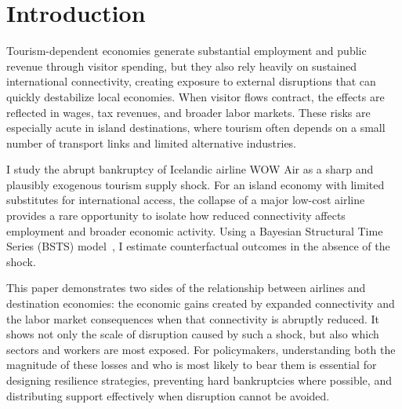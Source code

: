 \documentclass[12pt]{article}
\begin{document}
\begin{abstract}
Tourism-dependent economies face substantial risks when international visitor flows are disrupted, yet evidence on the short-run labor market effects of sudden tourism supply shocks remains limited. This paper exploits the sudden bankruptcy of WOW Air as a natural experiment that sharply curtailed international tourism to Iceland. Using a Bayesian Structural Time Series model, I estimate labor market outcomes relative to a counterfactual in which the airline did not exit. Nine months later, I find that the bankruptcy reduced international travel by more than 20\% and tourism employment (excluding air transport) by 8\%. At the national level, unemployment was nearly 50\% higher than would otherwise have been expected. These results highlight the vulnerability of tourism-dependent economies to sudden transport disruptions.
\\ 
\\
Keywords: tourism employment; air transport; tourism shocks; labor markets; island economies; causal inference
\end{abstract}
\clearpage

\section{Introduction}\label{sec:Introduction}
Tourism-dependent economies generate substantial employment and public revenue through visitor spending, but they also rely heavily on sustained international connectivity, creating exposure to external disruptions that can quickly destabilize local economies. When visitor flows contract, the effects are reflected in wages, tax revenues, and broader labor markets. These risks are especially acute in island destinations, where tourism often depends on a small number of transport links and limited alternative industries.

I study the abrupt bankruptcy of Icelandic airline WOW Air as a sharp and plausibly exogenous tourism supply shock. For an island economy with limited substitutes for international access, the collapse of a major low-cost airline provides a rare opportunity to isolate how reduced connectivity affects employment and broader economic activity. Using a Bayesian Structural Time Series (BSTS) model~\citep{brodersen_2015_inferring}, I estimate counterfactual outcomes in the absence of the shock.

This paper demonstrates two sides of the relationship between airlines and destination economies: the economic gains created by expanded connectivity and the labor market consequences when that connectivity is abruptly reduced. It shows not only the scale of disruption caused by such a shock, but also which sectors and workers are most exposed. For policymakers, understanding both the magnitude of these losses and who is most likely to bear them is essential for designing resilience strategies, preventing hard bankruptcies where possible, and distributing support effectively when disruption cannot be avoided.
\end{document}
